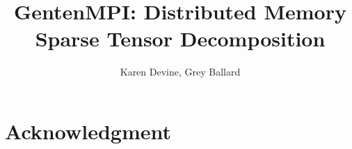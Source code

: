 \documentclass[pdf,12pt,report,strict]{SANDreport}
\title{GentenMPI:  Distributed Memory Sparse Tensor Decomposition}
\author{Karen Devine, Grey Ballard}		%
\date{}		%
\begin{document}
    \maketitle

    \begin{abstract}
    
    \end{abstract}


    \clearpage
    \chapter*{Acknowledgment}
    


    \cleardoublepage		%
    \tableofcontents
    \listoffigures






\end{document}
